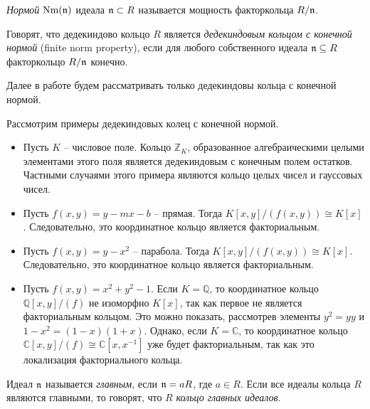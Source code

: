 \documentclass[_00_dissertation.tex]{subfiles}
\begin{document}
\begin{definition}
    \emph{Нормой} $\textrm{Nm}(\mathfrak{n})$ идеала $\mathfrak{n} \subset R$ называется мощность факторкольца $R/\mathfrak{n}$.

    Говорят, что дедекиндово кольцо $R$ является \emph{дедекиндовым кольцом с конечной нормой} (finite norm property), если для любого собственного идеала $\mathfrak{n} \subseteq R$ факторкольцо $R/\mathfrak{n}$ конечно.
\end{definition}

Далее в работе будем рассматривать только дедекиндовы кольца с конечной нормой.

\begin{example}
    Рассмотрим примеры дедекиндовых колец с конечной нормой.
    \begin{itemize}
        \item Пусть $K$ -- числовое поле.
        Кольцо $\mathbb{Z}_K$, образованное алгебраическими целыми элементами этого поля является дедекиндовым с конечным полем остатков.
        Частными случаями этого примера являются кольцо целых чисел и гауссовых чисел.
        
        \item Пусть $f(x, y) = y - mx - b$ -- прямая.
        Тогда $K[x, y]/(f(x, y)) \cong K[x]$.
        Следовательно, это координатное кольцо является факториальным.
        
        \item Пусть $f(x, y) = y - x^2$ -- парабола.
        Тогда $K[x, y]/(f(x, y)) \cong K[x]$.
        Следовательно, это координатное кольцо является факториальным.
    
        \item Пусть $f(x, y) = x^2 + y^2 - 1$.
        Если $K = \mathbb{Q}$, то координатное кольцо $\mathbb{Q}[x, y]/(f)$ не изоморфно $K[x]$, так как первое не является факториальным кольцом.
        Это можно показать, рассмотрев элементы $y^2 = yy$ и $1-x^2 = (1-x)(1+x)$.
        Однако, если $K = \mathbb{C}$, то координатное кольцо $\mathbb{C}[x, y]/(f) \cong \mathbb{C}[x, x^{-1}]$ уже будет факториальным, так как это локализация факториального кольца.
    \end{itemize}
\end{example}

\begin{definition}
    Идеал $\mathfrak{n}$ называется \emph{главным}, если $\mathfrak{n} = aR$, где $a \in R$.
    Если все идеалы кольца $R$ являются главными, то говорят, что $R$ \emph{кольцо главных идеалов}.
\end{definition}
\end{document}

